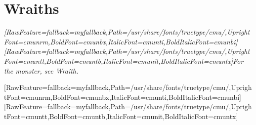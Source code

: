 \chapter{Wraiths}
\label{0}
\begin{myquote}
\item{}{\itshape \allowbreak{}\setmainfont{cmunti.ttf}[RawFeature={fallback=myfallback},Path=/usr/share/fonts/truetype/cmu/,UprightFont=cmunrm,BoldFont=cmunbx,ItalicFont=cmunti,BoldItalicFont=cmunbi]\setmonofont{cmunti.ttf}[RawFeature={fallback=myfallback},Path=/usr/share/fonts/truetype/cmu/,UprightFont=cmuntt,BoldFont=cmuntb,ItalicFont=cmunit,BoldItalicFont=cmuntx]\itshape For the monster, see Wraith\footnotemark[1].}
\end{myquote}
\allowbreak{}\setmainfont{cmunrm.ttf}[RawFeature={fallback=myfallback},Path=/usr/share/fonts/truetype/cmu/,UprightFont=cmunrm,BoldFont=cmunbx,ItalicFont=cmunti,BoldItalicFont=cmunbi]\setmonofont{cmunrm.ttf}[RawFeature={fallback=myfallback},Path=/usr/share/fonts/truetype/cmu/,UprightFont=cmuntt,BoldFont=cmuntb,ItalicFont=cmunit,BoldItalicFont=cmuntx]
